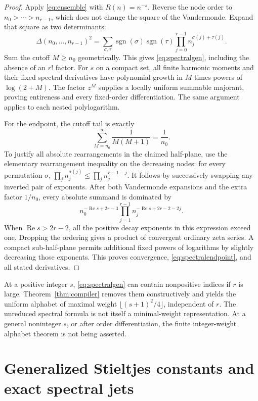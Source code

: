 \documentclass[11pt,letterpaper]{article}
\numberwithin{equation}{section}
\theoremstyle{definition}\newtheorem{definition}[theorem]{Definition}
\theoremstyle{remark}\newtheorem{remark}[theorem]{Remark}
\begin{document}
\begin{proof}
Apply \eqref{eq:ensemble} with $R(n)=n^{-s}$. Reverse the node order
to $n_0>\cdots>n_{r-1}$, which does not change the square of the
Vandermonde. Expand that square as two determinants:
\[
 \Delta(n_0,\ldots,n_{r-1})^2
 =\sum_{\sigma,\tau}\operatorname{sgn}(\sigma)
       \operatorname{sgn}(\tau)\prod_{j=0}^{r-1}
                           n_j^{\sigma(j)+\tau(j)}.
\]
Sum the cutoff $M\ge n_0$ geometrically. This gives
\eqref{eq:spectralgen}, including the absence of an $r!$ factor.
For $s$ on a compact set, all finite harmonic moments and their fixed
spectral derivatives have polynomial growth in $M$ times powers of
$\log(2+M)$. The factor $z^M$ supplies a locally uniform summable
majorant, proving entireness and every fixed-order differentiation.
The same argument applies to each nested polylogarithm.

For the endpoint, the cutoff tail is exactly
\[
             \sum_{M=n_0}^{\infty}\frac1{M(M+1)}=\frac1{n_0}.
\]
To justify all absolute rearrangements in the claimed half-plane,
use the elementary rearrangement inequality on the decreasing nodes:
for every permutation $\sigma$,
$\prod_jn_j^{\sigma(j)}\le\prod_jn_j^{r-1-j}$.
It follows by successively swapping any inverted pair of exponents.
After both Vandermonde expansions and the extra factor $1/n_0$, every
absolute summand is dominated by
\[
 n_0^{-\operatorname{Re}s+2r-3}
             \prod_{j=1}^{r-1}n_j^{-\operatorname{Re}s+2r-2-2j}.
\]
When $\operatorname{Re}s>2r-2$, all the positive decay exponents in
this expression exceed one. Dropping the ordering gives a product of
convergent ordinary zeta series. A compact sub-half-plane permits
additional fixed powers of logarithms by slightly decreasing those
exponents. This proves convergence, \eqref{eq:spectralendpoint}, and
all stated derivatives.
\end{proof}

At a positive integer $s$, \eqref{eq:spectralgen} can contain
nonpositive indices if $r$ is large. Theorem~\ref{thm:compiler} removes
them constructively and yields the uniform alphabet of maximal weight
$\lfloor(s+1)^2/4\rfloor$, independent of $r$. The unreduced spectral
formula is not itself a minimal-weight representation. At a general
noninteger $s$, or after order differentiation, the finite integer-weight
alphabet theorem is not being asserted.

\section{Generalized Stieltjes constants and exact spectral jets}
\label{sec:stieltjes}
\end{document}
